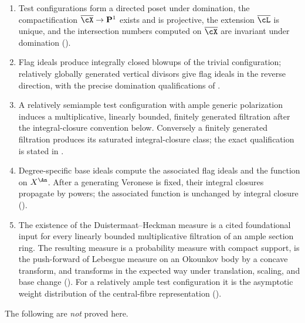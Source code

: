 \begin{enumerate}
\item\label{itm:ch33-scope:tc}
 Test configurations form a directed poset under domination, the
 compactification $\overline\cX\to\mathbf P^1$ exists and is projective,
 the extension $\overline\cL$ is unique, and the intersection numbers
 computed on $\overline\cX$ are invariant under domination
 ().
\item\label{itm:ch33-scope:flag}
 Flag ideals produce integrally closed blowups of the trivial configuration;
 relatively globally generated vertical divisors give flag ideals in the
 reverse direction, with the precise domination qualifications of
 .
\item\label{itm:ch33-scope:norm}
 A relatively semiample test configuration with ample generic polarization
 induces a multiplicative, linearly bounded, finitely generated filtration
 after the integral-closure convention below.
 Conversely a finitely generated filtration produces its saturated
integral-closure class; the exact qualification is stated in
 .
\item\label{itm:ch33-scope:base}
 Degree-specific base ideals compute the associated flag ideals and the
 function on $X^{\An}$.  After a generating Veronese is fixed, their
 integral closures propagate by powers; the associated function is
 unchanged by integral closure
 ().
\item\label{itm:ch33-scope:dh}
 The existence of the Duistermaat--Heckman measure is a cited foundational
 input for every linearly bounded multiplicative filtration of an
 ample section ring.  The resulting measure is a probability measure
 with compact support, is the push-forward of Lebesgue measure on
 an Okounkov body by a concave transform, and transforms in the expected
 way under translation, scaling, and base change
 ().
 For a relatively ample test configuration it is the asymptotic weight distribution of the
 central-fibre representation
 ().
\end{enumerate}

The following are \emph{not} proved here.

